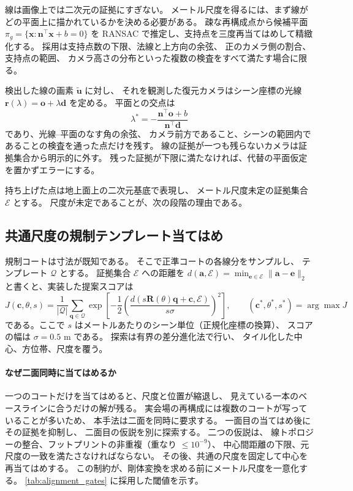 線は画像上では二次元の証拠にすぎない。
メートル尺度を得るには、まず線がどの平面上に描かれているかを決める必要がある。
疎な再構成点から候補平面
\(\pi_g=\{\mathbf{x}:\mathbf{n}^{\top}\mathbf{x}+b=0\}\)
を RANSAC で推定し、支持点を三度再当てはめして精緻化する。
採用は支持点数の下限、法線と上方向の余弦、
正のカメラ側の割合、支持点の範囲、
カメラ高さの分布といった複数の検査をすべて満たす場合に限る。

検出した線の画素 \(\tilde{\mathbf{u}}\) に対し、
それを観測した復元カメラはシーン座標の光線
\(\mathbf{r}(\lambda)=\mathbf{o}+\lambda\mathbf{d}\) を定める。
平面との交点は
\begin{equation}
  \lambda^*=-\frac{\mathbf{n}^{\top}\mathbf{o}+b}{\mathbf{n}^{\top}\mathbf{d}}
  \label{eq:ray_plane}
\end{equation}
であり、光線--平面のなす角の余弦、
カメラ前方であること、シーンの範囲内であることの検査を通った点だけを残す。
線の証拠が一つも残らないカメラは証拠集合から明示的に外す。
残った証拠が下限に満たなければ、代替の平面仮定を置かずエラーにする。

持ち上げた点は地上面上の二次元基底で表現し、
メートル尺度未定の証拠集合 \(\mathcal{E}\) とする。
尺度が未定であることが、次の段階の理由である。

\subsection{共通尺度の規制テンプレート当てはめ}
\label{sec:template_fit}

規制コートは寸法が既知である。
そこで正準コートの各線分をサンプルし、
テンプレート \(\mathcal{Q}\) とする。
証拠集合 \(\mathcal{E}\) への距離を
\(d(\mathbf{a},\mathcal{E})=\min_{\mathbf{e}\in\mathcal{E}}\|\mathbf{a}-\mathbf{e}\|_2\)
と書くと、実装した提案スコアは
\begin{equation}
  J(\mathbf{c},\theta,s)=\frac{1}{|\mathcal{Q}|}
  \sum_{\mathbf{q}\in\mathcal{Q}}
  \exp\!\left[-\frac{1}{2}
    \left(\frac{d(s\mathbf{R}(\theta)\mathbf{q}+\mathbf{c},\mathcal{E})}
                    {s\sigma}\right)^{2}\right],
  \qquad
  (\mathbf{c}^*,\theta^*,s^*)=\arg\max J
  \label{eq:template_fit}
\end{equation}
である。ここで \(s\) はメートルあたりのシーン単位（正規化座標の換算）、
スコアの幅は \(\sigma=0.5\) m である。
探索は有界の差分進化法で行い、
タイル化した中心、方位帯、尺度を覆う。

\paragraph{なぜ二面同時に当てはめるか}
一つのコートだけを当てはめると、尺度と位置が縮退し、
見えている一本のベースラインに合うだけの解が残る。
実会場の再構成には複数のコートが写っていることが多いため、
本手法は二面を同時に要求する。
一面目の当てはめ後にその証拠を抑制し、
二面目の仮説を別に探索する。
二つの仮説は、
線トポロジーの整合、フットプリントの非重複（重なり \(\leq 10^{-9}\)）、
中心間距離の下限、元尺度の一致を満たさなければならない。
その後、共通の尺度を固定して中心を再当てはめする。
この制約が、剛体変換を求める前にメートル尺度を一意化する。
\cref{tab:alignment_gates} に採用した閾値を示す。

